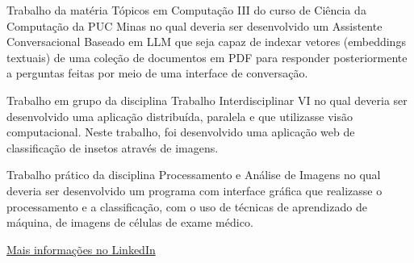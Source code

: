 
Trabalho da matéria Tópicos em Computação III do curso de Ciência da Computação da PUC Minas no qual deveria ser desenvolvido um Assistente Conversacional Baseado em LLM que seja capaz de indexar vetores (embeddings textuais) de uma coleção de documentos em PDF para responder posteriormente a perguntas feitas por meio de uma interface de conversação.\\
\divider

Trabalho em grupo da disciplina Trabalho Interdisciplinar VI no qual deveria ser desenvolvido uma aplicação distribuída, paralela e que utilizasse visão computacional. Neste trabalho, foi desenvolvido uma aplicação web de classificação de insetos através de imagens.\\
\divider

Trabalho prático da disciplina Processamento e Análise de Imagens no qual deveria ser desenvolvido um programa com interface gráfica que realizasse o processamento e a classificação, com o uso de técnicas de aprendizado de máquina, de imagens de células de exame médico.\\
\divider

{\large\color{emphasis}\href{https://www.linkedin.com/in/henriquemcc/details/projects/}{Mais informações no LinkedIn}}